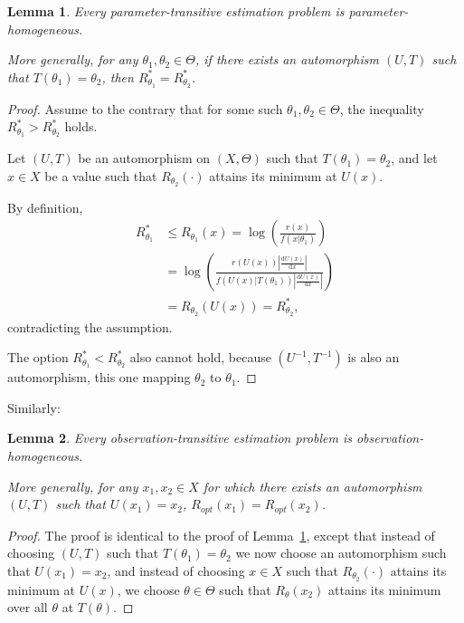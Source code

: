\documentclass{IEEEtran}
\newtheorem{lemma}{Lemma}
\begin{document}
\begin{lemma}\label{L:homogenous}
Every parameter-transitive estimation problem is parameter-homogeneous.

More generally, for any $\theta_1, \theta_2\in\Theta$, if there exists an
automorphism $(U,T)$ such that $T(\theta_1)=\theta_2$, then
$R^*_{\theta_1}=R^*_{\theta_2}$.
\end{lemma}

\begin{proof}
Assume to the contrary that for some such $\theta_1, \theta_2\in\Theta$, the
inequality
$R^*_{\theta_1}>R^*_{\theta_2}$
holds.

Let $(U,T)$ be an automorphism on $(X,\Theta)$ such that $T(\theta_1)=\theta_2$,
and let $x\in X$ be a value such that $R_{\theta_2}(\cdot)$ attains its minimum
at $U(x)$.

By definition,
\begin{align*}
R^*_{\theta_1} &\le R_{\theta_1}(x)
=\log\left(\frac{r(x)}{f(x|\theta_1)}\right) \\
&=\log\left(\frac{r(U(x))\left|\frac{\text{d}U(x)}{\text{d}x}\right|}{f(U(x)|T(\theta_1))\left|\frac{\text{d}U(x)}{\text{d}x}\right|}\right) \\
&=R_{\theta_2}(U(x))
=R^*_{\theta_2},
\end{align*}
contradicting the assumption.

The option $R^*_{\theta_1}<R^*_{\theta_2}$ also
cannot hold, because $(U^{-1}, T^{-1})$ is also an automorphism, this one
mapping $\theta_2$ to $\theta_1$.
\end{proof}

Similarly:

\begin{lemma}\label{L:comprehensive}
Every observation-transitive estimation problem is observation-homogeneous.

More generally, for any $x_1,x_2\in X$ for which there exists an automorphism
$(U,T)$ such that $U(x_1)=x_2$,
$R_{\textit{opt}}(x_1)=R_{\textit{opt}}(x_2)$.
\end{lemma}

\begin{proof}
The proof is identical to the proof of Lemma~\ref{L:homogenous},
except that instead of choosing $(U,T)$ such that $T(\theta_1)=\theta_2$
we now choose an automorphism such that $U(x_1)=x_2$, and instead of
choosing $x\in X$ such that $R_{\theta_2}(\cdot)$ attains its minimum at $U(x)$,
we choose $\theta \in \Theta$ such that $R_{\theta}(x_2)$ attains its minimum
over all $\theta$ at $T(\theta)$.
\end{proof}
\end{document}
